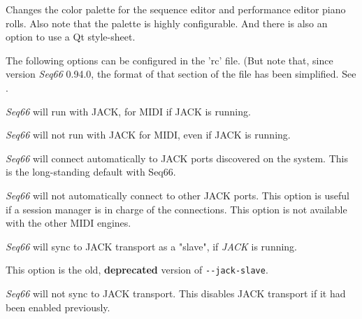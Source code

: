       Changes the color palette for the sequence editor and performance editor
      piano rolls.  Also note that the palette is highly configurable.
      And there is also an option to use a Qt style-sheet.


   The following options can be configured in the 'rc' file. (But note that,
   since version \textsl{Seq66} 0.94.0, the format of that section of the file
   has been simplified.
   See .

      \textsl{Seq66} will run with JACK, for MIDI if JACK is running.


      \textsl{Seq66} will not run with JACK for MIDI, even if JACK is running.


      \textsl{Seq66} will connect automatically to JACK ports discovered on the
      system. This is the long-standing default with Seq66.


      \textsl{Seq66} will not automatically connect to other JACK ports.
      This option is useful if a session manager is in charge of the
      connections.
      This option is not available with the other MIDI engines.



      \textsl{Seq66} will sync to JACK transport as a "slave", if \textsl{JACK}
      is running.

      This option is the old, \textbf{deprecated} version of
      \texttt{-{}-jack-slave}.


      \textsl{Seq66} will not sync to JACK transport.
      This disables JACK transport if it had been enabled previously.

